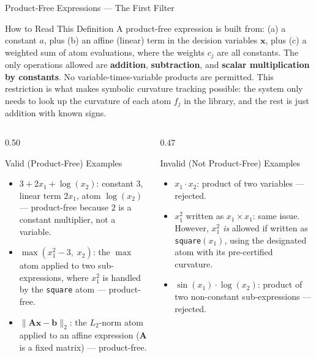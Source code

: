 \documentclass[aspectratio=169,10pt]{beamer}
\begin{document}
\begin{frame}[allowframebreaks]{Product-Free Expressions --- The First Filter}
  \begin{alertblock}{How to Read This Definition}
    A product-free expression is built from: (a) a constant $a$,
    plus (b) an affine (linear) term in the decision variables
    $\mathbf{x}$, plus (c) a weighted sum of atom evaluations, where
    the weights $c_j$ are all constants.  The only operations allowed
    are \textbf{addition}, \textbf{subtraction}, and \textbf{scalar
    multiplication by constants}.  No variable-times-variable products
    are permitted.  This restriction is what makes symbolic curvature
    tracking possible: the system only needs to look up the curvature
    of each atom $f_j$ in the library, and the rest is just addition
    with known signs.
  \end{alertblock}

  \begin{columns}
    \begin{column}{0.50\textwidth}
      \begin{exampleblock}{Valid (Product-Free) Examples}
        \begin{itemize}
          \item $3 + 2x_1 + \log(x_2)$: constant $3$, linear term
                $2x_1$, atom $\log(x_2)$ --- product-free because $2$
                is a constant multiplier, not a variable.
          \item $\max(x_1^2 - 3,\; x_2)$: the $\max$ atom applied to
                two sub-expressions, where $x_1^2$ is handled by the
                \texttt{square} atom --- product-free.
          \item $\|\mathbf{A}\mathbf{x} - \mathbf{b}\|_2$: the
                $L_2$-norm atom applied to an affine expression
                ($\mathbf{A}$ is a fixed matrix) --- product-free.
        \end{itemize}
      \end{exampleblock}
    \end{column}
    \begin{column}{0.47\textwidth}
      \begin{alertblock}{Invalid (Not Product-Free) Examples}
        \begin{itemize}
          \item $x_1 \cdot x_2$: product of two variables --- rejected.
          \item $x_1^2$ written as $x_1 \times x_1$: same issue.
                However, $x_1^2$ \emph{is} allowed if written as
                \texttt{square}$(x_1)$, using the designated atom
                with its pre-certified curvature.
          \item $\sin(x_1) \cdot \log(x_2)$: product of two
                non-constant sub-expressions --- rejected.
        \end{itemize}
      \end{alertblock}
    \end{column}
  \end{columns}


\end{frame}
\end{document}
